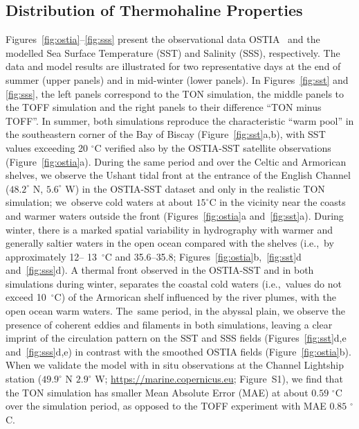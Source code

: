 \documentclass[jmse,article,accept,moreauthors,pdftex]{Definitions/mdpi}
\begin{document}
\subsection{Distribution of Thermohaline Properties}
\label{section:3.1}

Figures~\ref{fig:ostia}--\ref{fig:sss} present the observational data OSTIA~\cite{donlon2012} and the modelled Sea Surface Temperature (SST) and Salinity (SSS), respectively. The data and model results are illustrated for two representative days at the end of summer (upper panels) and in mid-winter (lower panels). In Figures~\ref{fig:sst} and \ref{fig:sss}, the left panels correspond to the TON simulation, the middle panels to the TOFF simulation and the right panels to their difference ``TON minus TOFF''. In summer, both simulations reproduce the characteristic ``warm pool'' in the southeastern corner of the Bay of Biscay (Figure~\ref{fig:sst}a,b), with SST values exceeding 20 $^\circ$C verified also by the OSTIA-SST satellite observations (Figure~\ref{fig:ostia}a). During the same period and over the Celtic and Armorican shelves, we observe the Ushant tidal front at the entrance of the English Channel ($48.2^\circ$ N, $5.6^\circ$ W) in the OSTIA-SST dataset and only in the realistic TON simulation; we~observe cold waters at about $15^\circ$C in the vicinity near the coasts and warmer waters outside the front (Figures~\ref{fig:ostia}a and~\ref{fig:sst}a). During winter, there is a marked spatial variability in hydrography with warmer and generally saltier waters in the open ocean compared with the shelves (i.e.,~by approximately 12{--}%
13~$^\circ$C and 35.6{--}35.8; Figures~\ref{fig:ostia}b,~\ref{fig:sst}d and~\ref{fig:sss}d). A thermal front observed in the OSTIA-SST and in both simulations during winter, separates the coastal cold waters (i.e.,~values do not exceed 10~$^\circ$C) of the Armorican shelf influenced by the river plumes, with the open ocean warm waters. The~same period, in the abyssal plain, we observe the presence of coherent eddies and filaments in both simulations, leaving a clear imprint of the circulation pattern on the SST and SSS fields (Figures~\ref{fig:sst}d,e and~\ref{fig:sss}d,e) in contrast with the smoothed OSTIA fields (Figure~\ref{fig:ostia}b). When we validate the model with in situ observations at the Channel Lightship station ($49.9^\circ$ N $2.9^\circ$ W; \url{https://marine.copernicus.eu}; Figure~S1), we find that the TON simulation has smaller Mean Absolute Error (MAE) at about $0.59$ $^\circ$C over the simulation period, as opposed to the TOFF experiment with MAE $0.85$ $^\circ$C.
\end{document}
